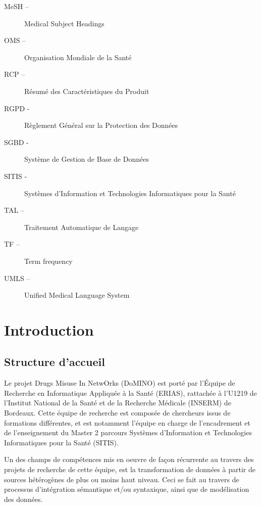 \documentclass[a4paper, 12pt, openany, oneside, abstract=on]{article} %
\begin{document}
\begin{description}
\item[MeSH –] \begin{it}Medical Subject Headings\end{it}
\item[OMS –] Organisation Mondiale de la Santé
\item[RCP –] Résumé des Caractéristiques du Produit
\item[RGPD -] Règlement Général sur la Protection des Données
\item[SGBD -] Système de Gestion de Base de Données 
\item[SITIS -] Systèmes d’Information et Technologies Informatiques pour la Santé
\item[TAL –] Traitement Automatique de Langage
\item[TF –] \begin{it}Term frequency\end{it}
\item[UMLS –] \begin{it}Unified Medical Language System\end{it}
\end{description}

\lsstyle
\newpage
\pagestyle{fancy}
\setcounter{page}{1}
\section{Introduction}

\subsection{Structure d'accueil}
Le projet Drugs Misuse In NetwOrks (DoMINO) est porté par l'Équipe de Recherche en Informatique Appliquée à la Santé (ERIAS), rattachée à l'U1219 de l'Institut National de la Santé et de la Recherche Médicale (INSERM) de Bordeaux. Cette équipe de recherche est composée de chercheurs issus de formations différentes, et est notamment l'équipe en charge de l'encadrement et de l'enseignement du Master 2 parcours Systèmes d’Information et Technologies Informatiques pour la Santé (SITIS)\cite{ISPED}.

Un des champs de compétences mis en oeuvre de façon récurrente au travers des projets de recherche de cette équipe, est la transformation de données à partir de sources hétérogènes de plus ou moins haut niveau. Ceci se fait au travers de processus d'intégration sémantique et/ou syntaxique, ainsi que de modélisation des données\cite{BPHU1219}.
\end{document}

